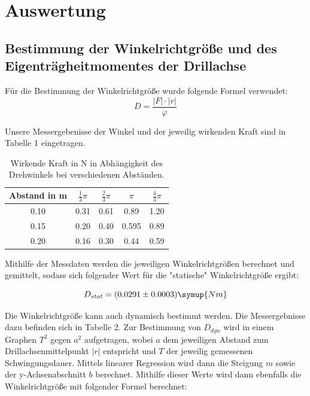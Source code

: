 \section{Auswertung}
\subsection{Bestimmung der Winkelrichtgröße und des Eigenträgheitmomentes der Drillachse}
Für die Bestimmung der Winkelrichtgröße wurde folgende Formel verwendet:
\begin{equation}
  D = \frac{\lvert F \rvert \cdot \lvert r \rvert}{\varphi}
\end{equation}

Unsere Messergebenisse der Winkel und der jeweilig wirkenden Kraft sind in Tabelle 1 eingetragen.

\begin{table}
  \centering
  \caption{Wirkende Kraft in N in Abhängigkeit des Drehwinkels bei verschiedenen Abständen.}
  \label{tab:data1}
  \begin{tabular}{c c c c c}
    \toprule Abstand in m & $\frac{1}{3} \pi$ & $\frac{2}{3} \pi$ & $ \pi$ & $\frac{4}{3} \pi$ \\
    \midrule
    0.10 & 0.31 & 0.61 & 0.89  & 1.20 \\
    0.15 & 0.20 & 0.40 & 0.595 & 0.89 \\
    0.20 & 0.16 & 0.30 & 0.44  & 0.59 \\
    \bottomrule
  \end{tabular}
\end{table}

Mithilfe der Messdaten werden die jeweiligen Winkelrichtgrößen berechnet und gemittelt,
sodass sich folgender Wert für die "statische" Winkelrichtgröße ergibt:

\begin{equation}
  D_{stat} = (0.0291 \pm 0.0003) \symup{Nm}
\end{equation}

Die Winkelrichtgröße kann auch dynamisch bestimmt werden. Die Messergebnisse dazu befinden sich
in Tabelle 2. Zur Bestimmung von $D_{dyn}$ wird in einem Graphen $T^2$ gegen $a^2$ aufgetragen,
wobei $a$ dem jeweiligen Abstand zum Drillachsenmittelpunkt $\lvert r \rvert$ entspricht und $T$
der jeweilig gemessenen Schwingungsdauer. Mittels linearer Regression wird dann die Steigung $m$ sowie
der y-Achsenabschnitt $b$ berechnet. Mithilfe dieser Werte wird dann ebenfalls die
Winkelrichtgröße mit folgender Formel berechnet:

